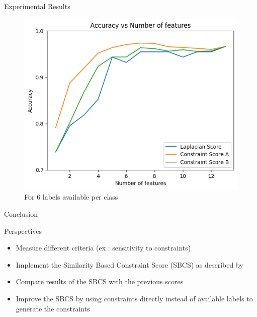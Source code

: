 \documentclass{beamer}
\begin{document}
\begin{frame}{Experimental Results}
    \begin{center}
\begin{figure}
    \includegraphics[height=0.75\textheight]{../Images/C62.png}
    \caption{ For 6 labels available per class}
\end{figure}
\end{center}
\end{frame}

\begin{frame}{Conclusion}
    \begin{block}{Perspectives}
        \begin{itemize}
            \item Measure different criteria (ex : sensitivity to constraints)
            \item Implement the Similarity Based Constraint Score (SBCS) as described by \cite{salmiSimilaritybasedConstraintScore2020}
            \item Compare results of the SBCS with the previous scores
            \item Improve the SBCS by using constraints directly instead of available labels to generate the constraints
        \end{itemize}
    \end{block}
\end{frame}
\end{document}
